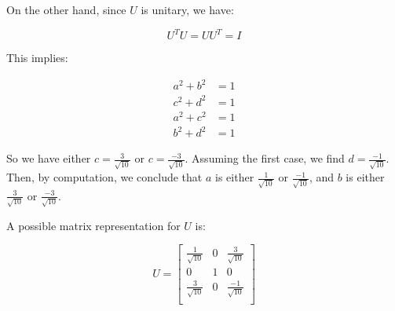 \documentclass{article}
\begin{document}
\begin{enumerate}[leftmargin=\labelsep]
On the other hand, since $U$ is unitary, we have:

\[
U^TU = UU^T = I
\]

This implies:

\begin{align*}
a^2 + b^2 &= 1 \\
c^2 + d^2 &= 1 \\
a^2 + c^2 &= 1 \\
b^2 + d^2 &= 1
\end{align*}

So we have either $c = \frac{3}{\sqrt{10}}$ or $c = \frac{-3}{\sqrt{10}}$. Assuming the first case, we find $d = \frac{-1}{\sqrt{10}}$. Then, by computation, we conclude that $a$ is either $\frac{1}{\sqrt{10}}$ or $\frac{-1}{\sqrt{10}}$, and $b$ is either $\frac{3}{\sqrt{10}}$ or $\frac{-3}{\sqrt{10}}$.

A possible matrix representation for $U$ is:

\[
U = \begin{bmatrix}
\frac{1}{\sqrt{10}} & 0 & \frac{3}{\sqrt{10}} \\
0 & 1 & 0 \\
\frac{3}{\sqrt{10}} & 0 & \frac{-1}{\sqrt{10}} \\
\end{bmatrix}
\]

\end{enumerate}
\end{document}
